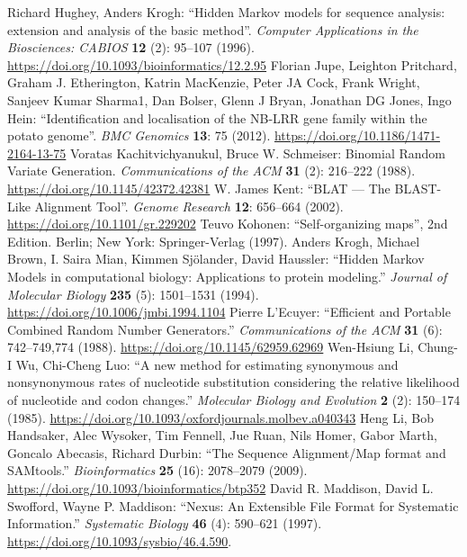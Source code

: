 \documentclass{report}
\begin{document}
\begin{thebibliography}{99}
Richard Hughey, Anders Krogh: ``Hidden Markov models for sequence analysis: extension and analysis of the basic method''. \textit{Computer Applications in the Biosciences: CABIOS} {\bf 12} (2): 95--107 (1996).  \url{https://doi.org/10.1093/bioinformatics/12.2.95}
Florian Jupe, Leighton Pritchard, Graham J. Etherington, Katrin MacKenzie, Peter JA Cock, Frank Wright, Sanjeev Kumar Sharma1, Dan Bolser, Glenn J Bryan, Jonathan DG Jones, Ingo Hein: ``Identification and localisation of the NB-LRR gene family within the potato genome''. \textit{BMC Genomics} {\bf 13}: 75 (2012).  \url{https://doi.org/10.1186/1471-2164-13-75}
Voratas Kachitvichyanukul, Bruce W. Schmeiser: Binomial Random Variate Generation. \textit{Communications of the ACM} {\bf 31} (2): 216--222 (1988). \url{https://doi.org/10.1145/42372.42381}
W. James Kent: ``BLAT --- The BLAST-Like Alignment Tool''. \textit{Genome Research} {\bf 12}: 656--664 (2002). \url{https://doi.org/10.1101/gr.229202}
Teuvo Kohonen: ``Self-organizing maps'', 2nd Edition. Berlin; New York: Springer-Verlag (1997).
Anders Krogh, Michael Brown, I. Saira Mian, Kimmen Sj\"olander, David Haussler: ``Hidden Markov Models in computational biology: Applications to protein modeling.'' \textit{Journal of Molecular Biology} {\bf 235} (5): 1501--1531 (1994). \url{https://doi.org/10.1006/jmbi.1994.1104}
Pierre L'Ecuyer: ``Efficient and Portable Combined Random Number Generators.'' \textit{Communications of the ACM} {\bf 31} (6): 742--749,774 (1988).  \url{https://doi.org/10.1145/62959.62969}
Wen-Hsiung Li, Chung-I Wu, Chi-Cheng Luo: ``A new method for estimating synonymous and nonsynonymous rates of nucleotide substitution considering the relative likelihood of nucleotide and codon changes.'' \textit{Molecular Biology and Evolution} {\bf 2} (2): 150--174 (1985). \url{https://doi.org/10.1093/oxfordjournals.molbev.a040343}
Heng Li, Bob Handsaker, Alec Wysoker, Tim Fennell, Jue Ruan, Nils Homer, Gabor Marth, Goncalo Abecasis, Richard Durbin: ``The Sequence Alignment/Map format and SAMtools.'' \textit{Bioinformatics} {\bf 25} (16): 2078--2079 (2009). \url{https://doi.org/10.1093/bioinformatics/btp352}
David R. Maddison, David L. Swofford, Wayne P. Maddison: ``Nexus: An Extensible File Format for Systematic Information.'' \textit{Systematic Biology} {\bf 46} (4): 590--621 (1997).  \url{https://doi.org/10.1093/sysbio/46.4.590}.

\end{thebibliography}
\end{document}
